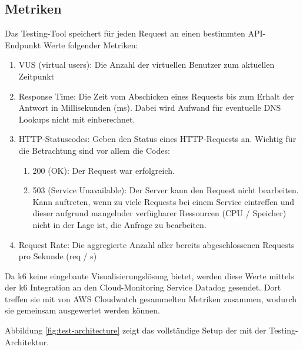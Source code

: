 \subsection{Metriken}
Das Testing-Tool speichert für jeden Request an einen bestimmten API-Endpunkt Werte folgender Metriken:
\begin{enumerate}
    \item VUS (virtual users): Die Anzahl der virtuellen Benutzer zum aktuellen Zeitpunkt 
    
    \item Response Time: Die Zeit vom Abschicken eines Requests bis zum Erhalt der Antwort in Millisekunden (ms). Dabei wird Aufwand für eventuelle DNS Lookups nicht mit einberechnet. 
    
    \item HTTP-Statuscodes: Geben den Status eines HTTP-Requests an. Wichtig für die Betrachtung sind vor allem die Codes:
        \begin{enumerate}
            \item 200 (OK): Der Request war erfolgreich.
            \item 503 (Service Unavailable): Der Server kann den Request nicht bearbeiten. Kann auftreten, wenn zu viele Requests bei einem Service eintreffen und dieser aufgrund mangelnder verfügbarer Ressourcen (CPU / Speicher) nicht in der Lage ist, die Anfrage zu bearbeiten.
        \end{enumerate}
        
    \item Request Rate: Die aggregierte Anzahl aller bereits abgeschlossenen Requests pro Sekunde (req / s)
\end{enumerate}

Da k6 keine eingebaute Visualisierungslösung bietet, werden diese Werte mittels der k6 Integration an den Cloud-Monitoring Service Datadog gesendet. Dort treffen sie mit von AWS Cloudwatch gesammelten Metriken zusammen, wodurch sie gemeinsam ausgewertet werden können.

Abbildung \ref{fig:test-architecture} zeigt das vollständige Setup der mit der Testing-Architektur.

